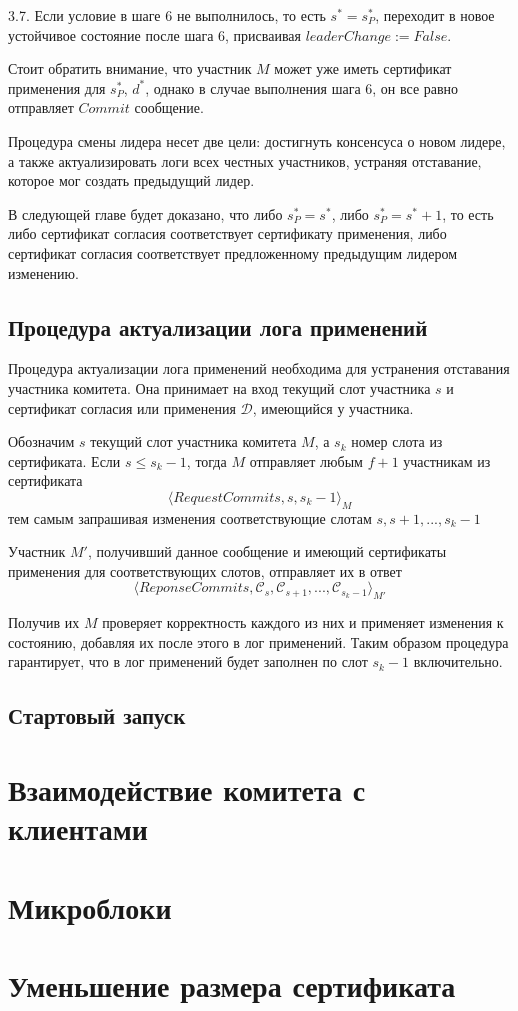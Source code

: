 3.7. Если условие в шаге 6 не выполнилось, то есть $s^{*}=s_P^{*}$, переходит в новое устойчивое состояние после шага 6, присваивая $leaderChange := False$.

Стоит обратить внимание, что участник $M$ может уже иметь сертификат применения для $s_P^{*}$, $d^{*}$, однако в случае выполнения  шага 6, он все равно отправляет $Commit$ сообщение.

Процедура смены лидера несет две цели: достигнуть консенсуса о новом лидере, а также актуализировать логи всех честных участников, устраняя отставание, которое мог создать предыдущий лидер.

В следующей главе будет доказано, что либо $s_P^{*}=s^{*}$, либо $s_P^{*}=s^{*}+1$, то есть либо сертификат согласия соответствует сертификату применения, либо сертификат согласия соответствует предложенному предыдущим лидером изменению.

\subsection{Процедура актуализации лога применений} \label{act_log}
Процедура актуализации лога применений необходима для устранения отставания участника комитета.
Она принимает на вход текущий слот участника $s$ и сертификат согласия или применения $\mathcal{D}$, имеющийся у участника.

Обозначим $s$ текущий слот участника комитета $M$, а $s_k$ номер слота из сертификата. Если $s \le s_k-1$, тогда $M$ отправляет любым $f+1$ участникам из сертификата 
\[ \langle RequestCommits, s, s_k-1 \rangle_M \]
тем самым запрашивая изменения соответствующие слотам $s, s+1,..., s_k-1$

Участник $M'$, получивший данное сообщение и имеющий сертификаты применения для соответствующих слотов, отправляет их в ответ
\[ \langle ReponseCommits, \mathcal{C}_s, \mathcal{C}_{s+1},...,\mathcal{C}_{s_k-1} \rangle_{M'} \]

Получив их $M$ проверяет корректность каждого из них и применяет изменения к состоянию, добавляя их после этого в лог применений. Таким образом процедура гарантирует, что в лог применений будет заполнен по слот $s_k-1$ включительно.

\subsection{Стартовый запуск}

\section{Взаимодействие комитета с клиентами}

\section{Микроблоки}

\section{Уменьшение размера сертификата}


